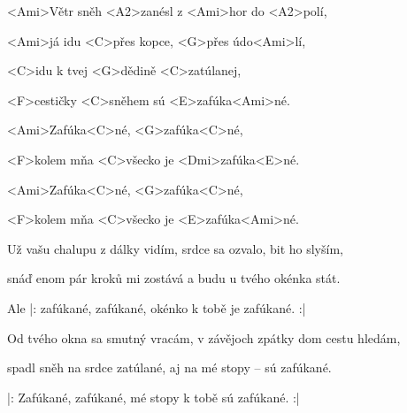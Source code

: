 





\zs
<Ami>Větr sněh <A2>zanésl z <Ami>hor do <A2>polí,

<Ami>já idu <C>přes kopce, <G>přes údo<Ami>lí, 

<C>idu k tvej <G>dědině <C>zatúlanej,

<F>cestičky <C>sněhem sú <E>zafúka<Ami>né.
\ks

\zr
<Ami>Zafúka<C>né, <G>zafúka<C>né,

<F>kolem mňa <C>všecko je <Dmi>zafúka<E>né. 

<Ami>Zafúka<C>né, <G>zafúka<C>né,

<F>kolem mňa <C>všecko je <E>zafúka<Ami>né.
\kr

\zs
Už vašu chalupu z dálky vidím, srdce sa ozvalo, bit ho slyším,

snáď enom pár kroků mi zostává a budu u tvého okénka stát.
\ks

\zr
Ale |: zafúkané, zafúkané, okénko k tobě je zafúkané. :|
\kr

\zs
Od tvého okna sa smutný vracám, v závějoch zpátky dom cestu hledám,

spadl sněh na srdce zatúlané, aj na mé stopy – sú zafúkané.
\ks

\zr
|: Zafúkané, zafúkané, mé stopy k tobě sú zafúkané. :|
\kr







\kp
